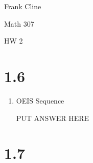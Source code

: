 \documentclass{article}
\begin{document}
\onehalfspacing
\hfill Frank Cline

\hfill Math 307

\hfill HW 2

\section*{1.6} %

\begin{enumerate}
\setcounter{enumi}{0}
\item OEIS Sequence

PUT ANSWER HERE
\end{enumerate}

\section*{1.7} %
\end{document}
